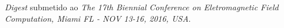 \label{ap:D}

\textit{Digest} submetido ao \textit{The 17th Biennial Conference on Eletromagnetic Field Computation, Miami FL - NOV 13-16, 2016, USA}.

